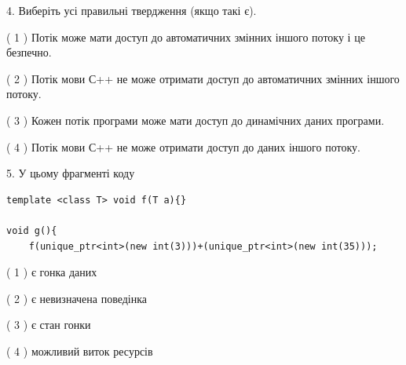 \documentclass[12pt, ukrainian]{article}
\begin{document}
\begin {large}
{%
4. Виберіть усі правильні твердження (якщо такі є).\par
\vspace{2mm}

( 1 ) Потік може мати доступ до автоматичних змінних іншого потоку і це безпечно.%

( 2 ) Потік мови С++ не може отримати доступ до автоматичних змінних іншого потоку.%

( 3 ) Кожен потік програми може мати доступ до динамічних даних програми.%

( 4 ) Потік мови С++ не може отримати доступ до даних іншого потоку.%


5. У цьому фрагменті коду
\begin{verbatim}
template <class T> void f(T a){}

void g(){
    f(unique_ptr<int>(new int(3)))+(unique_ptr<int>(new int(35)));
\end{verbatim}

( 1 ) є гонка даних%

( 2 ) є невизначена поведінка%

( 3 ) є стан гонки%

( 4 ) можливий виток ресурсів%
}
\end {large}
\end{document}
